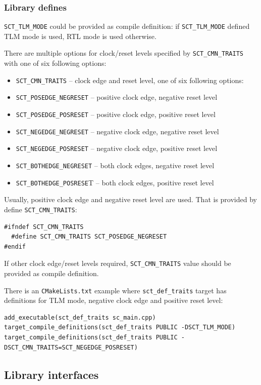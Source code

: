 \subsubsection{Library defines}
{\tt SCT\_TLM\_MODE} could be provided as compile definition: if {\tt SCT\_TLM\_MODE} defined TLM mode is used, RTL mode is used otherwise.

There are multiple options for clock/reset levels specified by {\tt SCT\_CMN\_TRAITS} with one of six following options:

\begin{itemize}
\item {\tt SCT\_CMN\_TRAITS} -- clock edge and reset level, one of six following options:
\item {\tt SCT\_POSEDGE\_NEGRESET} -- positive clock edge, negative reset level
\item {\tt SCT\_POSEDGE\_POSRESET} -- positive clock edge, positive reset level
\item {\tt SCT\_NEGEDGE\_NEGRESET} -- negative clock edge, negative reset level
\item {\tt SCT\_NEGEDGE\_POSRESET} -- negative clock edge, positive reset level
\item {\tt SCT\_BOTHEDGE\_NEGRESET} -- both clock edges, negative reset level
\item {\tt SCT\_BOTHEDGE\_POSRESE}T -- both clock edges, positive reset level
\end{itemize}

Usually, positive clock edge and negative reset level are used. That is provided by define {\tt  SCT\_CMN\_TRAITS}:
\begin{lstlisting}[style=mycpp]
#ifndef SCT_CMN_TRAITS
  #define SCT_CMN_TRAITS SCT_POSEDGE_NEGRESET
#endif
\end{lstlisting}

If other clock edge/reset levels required, {\tt SCT\_CMN\_TRAITS} value should be provided as compile definition.

There is an {\tt CMakeLists.txt} example where {\tt sct\_def\_traits} target has definitions for TLM mode, negative clock edge and positive reset level:
\begin{lstlisting}[style=mycmake]
add_executable(sct_def_traits sc_main.cpp)
target_compile_definitions(sct_def_traits PUBLIC -DSCT_TLM_MODE)
target_compile_definitions(sct_def_traits PUBLIC -DSCT_CMN_TRAITS=SCT_NEGEDGE_POSRESET)
\end{lstlisting}


\subsection{Library interfaces}\label{section:sct_interfaces}


